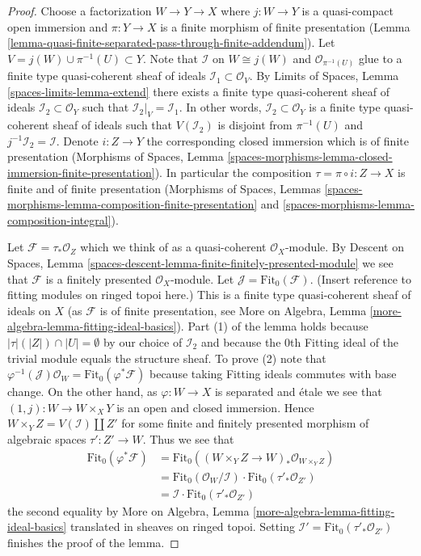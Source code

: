 \begin{proof}
Choose a factorization $W \to Y \to X$ where $j : W \to Y$ is a
quasi-compact open immersion and $\pi : Y \to X$ is a finite
morphism of finite presentation
(Lemma \ref{lemma-quasi-finite-separated-pass-through-finite-addendum}).
Let $V = j(W) \cup \pi^{-1}(U) \subset Y$. Note that
$\mathcal{I}$ on $W \cong j(W)$ and $\mathcal{O}_{\pi^{-1}(U)}$
glue to a finite type quasi-coherent sheaf of ideals
$\mathcal{I}_1 \subset \mathcal{O}_V$. By
Limits of Spaces, Lemma \ref{spaces-limits-lemma-extend}
there exists a finite type quasi-coherent sheaf of ideals
$\mathcal{I}_2 \subset \mathcal{O}_Y$ such that
$\mathcal{I}_2|_V = \mathcal{I}_1$. In other words,
$\mathcal{I}_2 \subset \mathcal{O}_Y$
is a finite type quasi-coherent sheaf of ideals such that
$V(\mathcal{I}_2)$ is disjoint from $\pi^{-1}(U)$ and
$j^{-1}\mathcal{I}_2 = \mathcal{I}$. Denote $i : Z \to Y$
the corresponding closed immersion which is of finite presentation
(Morphisms of Spaces, Lemma
\ref{spaces-morphisms-lemma-closed-immersion-finite-presentation}).
In particular the composition $\tau = \pi \circ i : Z \to X$ is finite
and of finite presentation
(Morphisms of Spaces, Lemmas
\ref{spaces-morphisms-lemma-composition-finite-presentation} and
\ref{spaces-morphisms-lemma-composition-integral}).

\medskip\noindent
Let $\mathcal{F} = \tau_*\mathcal{O}_Z$ which we think of as
a quasi-coherent $\mathcal{O}_X$-module. By
Descent on Spaces, Lemma
\ref{spaces-descent-lemma-finite-finitely-presented-module}
we see that $\mathcal{F}$ is a finitely presented $\mathcal{O}_X$-module.
Let $\mathcal{J} = \text{Fit}_0(\mathcal{F})$. (Insert reference to
fitting modules on ringed topoi here.) This is a finite type quasi-coherent
sheaf of ideals on $X$ (as $\mathcal{F}$ is of finite presentation, see
More on Algebra, Lemma \ref{more-algebra-lemma-fitting-ideal-basics}).
Part (1) of the lemma holds because $|\tau|(|Z|) \cap |U| = \emptyset$
by our choice of $\mathcal{I}_2$ and because the $0$th Fitting ideal
of the trivial module equals the structure sheaf. To prove (2) note that
$\varphi^{-1}(\mathcal{J})\mathcal{O}_W = \text{Fit}_0(\varphi^*\mathcal{F})$
because taking Fitting ideals commutes with base change.
On the other hand, as $\varphi : W \to X$ is separated and \'etale
we see that $(1, j) : W \to W \times_X Y$ is an open and closed immersion.
Hence $W \times_Y Z = V(\mathcal{I}) \amalg Z'$ for some finite and
finitely presented morphism of algebraic spaces $\tau' : Z' \to W$.
Thus we see that
\begin{align*}
\text{Fit}_0(\varphi^*\mathcal{F}) & =
\text{Fit}_0((W \times_Y Z \to W)_*\mathcal{O}_{W \times_Y Z}) \\
& =
\text{Fit}_0(\mathcal{O}_W/\mathcal{I}) \cdot
\text{Fit}_0(\tau'_*\mathcal{O}_{Z'}) \\
& =
\mathcal{I} \cdot \text{Fit}_0(\tau'_*\mathcal{O}_{Z'})
\end{align*}
the second equality by
More on Algebra, Lemma \ref{more-algebra-lemma-fitting-ideal-basics}
translated in sheaves on ringed topoi.
Setting $\mathcal{I}' = \text{Fit}_0(\tau'_*\mathcal{O}_{Z'})$
finishes the proof of the lemma.
\end{proof}

